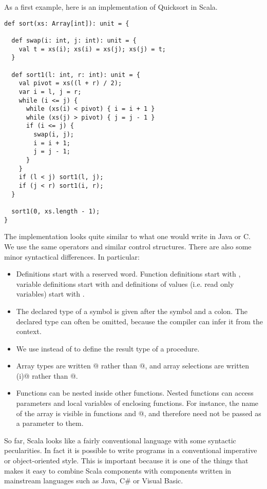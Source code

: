\documentclass[11pt]{book}
\begin{document}
As a first example, here is an implementation of Quicksort in Scala.
\begin{verbatim}
def sort(xs: Array[int]): unit = {

  def swap(i: int, j: int): unit = {
    val t = xs(i); xs(i) = xs(j); xs(j) = t;
  }

  def sort1(l: int, r: int): unit = {
    val pivot = xs((l + r) / 2);
    var i = l, j = r;
    while (i <= j) {
      while (xs(i) < pivot) { i = i + 1 }
      while (xs(j) > pivot) { j = j - 1 }
      if (i <= j) { 
        swap(i, j);
        i = i + 1;
        j = j - 1;
      }
    } 
    if (l < j) sort1(l, j);
    if (j < r) sort1(i, r);
  }

  sort1(0, xs.length - 1);
}
\end{verbatim}
The implementation looks quite similar to what one would write in Java
or C.  We use the same operators and similar control structures.
There are also some minor syntactical differences. In particular:
\begin{itemize}
\item
Definitions start with a reserved word. Function definitions start
with \verb@def@, variable definitions start with \verb@var@ and
definitions of values (i.e. read only variables) start with \verb@val@.
\item
The declared type of a symbol is given after the symbol and a colon.
The declared type can often be omitted, because the compiler can infer
it from the context.
\item
We use \verb@unit@ instead of \verb@void@ to define the result type of
a procedure.
\item
Array types are written \verb@Array[T]@ rather than \verb@T[]@, 
and array selections are written \verb@a(i)@ rather than \verb@a[i]@.
\item
Functions can be nested inside other functions. Nested functions can
access parameters and local variables of enclosing functions. For
instance, the name of the array \verb@a@ is visible in functions
\verb@swap@ and @, and therefore need not be passed as a
parameter to them.
\end{itemize}
So far, Scala looks like a fairly conventional language with some
syntactic pecularities. In fact it is possible to write programs in a
conventional imperative or object-oriented style. This is important
because it is one of the things that makes it easy to combine Scala
components with components written in mainstream languages such as
Java, C\# or Visual Basic.
\end{document}
